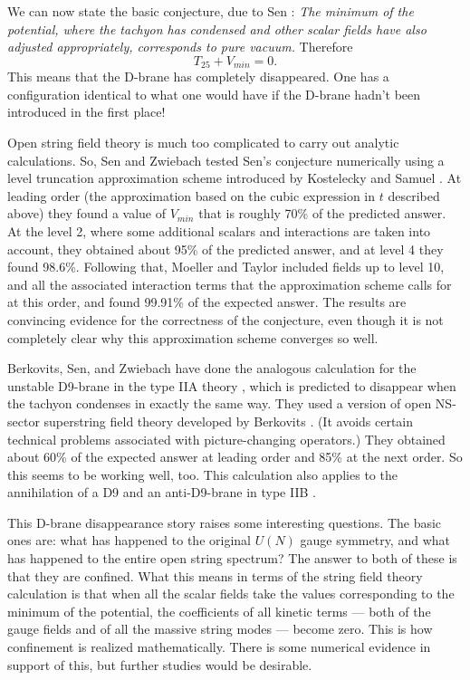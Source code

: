 \documentclass[a4paper,12pt]{article}
\begin{document}
We can now state the basic conjecture, due to Sen \cite{AS2}:  {\it The
minimum of the potential, where the tachyon has condensed and
other scalar fields have also adjusted appropriately, corresponds
to pure vacuum.} Therefore
\begin{equation}
T_{25} + V_{min} = 0.
\end{equation}
This means that the D-brane has completely disappeared.  One has a
configuration identical to what one would have if the D-brane
hadn't been introduced in the first place!

Open string field theory is much too complicated to carry out
analytic calculations.  So, Sen and Zwiebach \cite{SZ} tested Sen's
conjecture numerically using a level truncation approximation
scheme introduced by Kostelecky and Samuel \cite{KS}.  At leading order (the
approximation based on the cubic expression in $t$ described
above) they found a value of $V_{min}$ that is roughly 70\% of the
predicted answer.  At the level 2, where some additional
scalars and interactions are taken into account, they obtained
about 95\% of the predicted answer, and at level 4 they found 98.6\%.  
Following that, Moeller and
Taylor \cite{MT} included fields up to level 10, and all the associated
interaction terms that the approximation scheme calls for at this
order, and found 99.91\% of the expected answer.  The results are
convincing evidence for the correctness of the conjecture, even
though it is not completely clear why this approximation scheme
converges so well.

Berkovits, Sen, and Zwiebach have done the analogous calculation
for the unstable D9-brane in the type IIA theory \cite{BSZ}, which
is predicted to disappear when the tachyon condenses in exactly
the same way.  They used a version of open NS-sector superstring
field theory developed by Berkovits \cite{NB}.  (It avoids certain
technical problems associated with picture-changing operators.)
They obtained about 60\% of the expected answer at leading order
and 85\% at the next order. So this seems to be working well, too.
This calculation also applies to the annihilation of a D9 and an
anti-D9-brane in type IIB \cite{AS3}.

This D-brane disappearance story raises some interesting
questions.  The basic ones are: what has happened to the original
$U(N)$ gauge symmetry, and what has happened to the entire open
string spectrum?  The answer to both of these is that they are
confined.  What this means in terms of the string field theory
calculation is that when all the scalar fields take the values
corresponding to the minimum of the potential, the coefficients of
all kinetic terms --- both of the gauge fields and of all the
massive string modes --- become zero.  This is how confinement is
realized mathematically.  There is some numerical evidence in
support of this, but further studies would be desirable.
\end{document}
